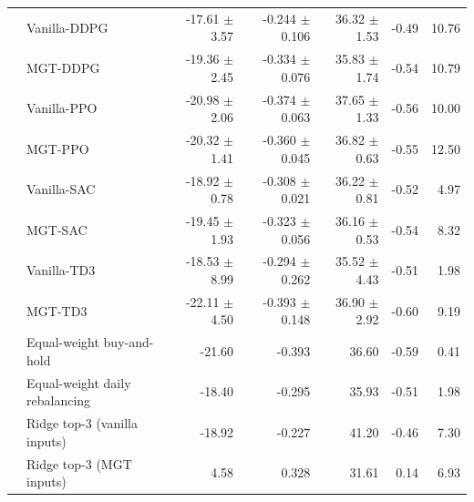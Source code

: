 \begin{table}[!t]
\begin{tabular}{llrrrrr}
 & Vanilla-DDPG & -17.61 $\pm$ 3.57 & -0.244 $\pm$ 0.106 & 36.32 $\pm$ 1.53 & -0.49 & 10.76 \\
 & MGT-DDPG & -19.36 $\pm$ 2.45 & -0.334 $\pm$ 0.076 & 35.83 $\pm$ 1.74 & -0.54 & 10.79 \\
 & Vanilla-PPO & -20.98 $\pm$ 2.06 & -0.374 $\pm$ 0.063 & 37.65 $\pm$ 1.33 & -0.56 & 10.00 \\
 & MGT-PPO & -20.32 $\pm$ 1.41 & -0.360 $\pm$ 0.045 & 36.82 $\pm$ 0.63 & -0.55 & 12.50 \\
 & Vanilla-SAC & -18.92 $\pm$ 0.78 & -0.308 $\pm$ 0.021 & 36.22 $\pm$ 0.81 & -0.52 & 4.97 \\
 & MGT-SAC & -19.45 $\pm$ 1.93 & -0.323 $\pm$ 0.056 & 36.16 $\pm$ 0.53 & -0.54 & 8.32 \\
 & Vanilla-TD3 & -18.53 $\pm$ 8.99 & -0.294 $\pm$ 0.262 & 35.52 $\pm$ 4.43 & -0.51 & 1.98 \\
 & MGT-TD3 & -22.11 $\pm$ 4.50 & -0.393 $\pm$ 0.148 & 36.90 $\pm$ 2.92 & -0.60 & 9.19 \\
 & Equal-weight buy-and-hold & -21.60 & -0.393 & 36.60 & -0.59 & 0.41 \\
 & Equal-weight daily rebalancing & -18.40 & -0.295 & 35.93 & -0.51 & 1.98 \\
 & Ridge top-3 (vanilla inputs) & -18.92 & -0.227 & 41.20 & -0.46 & 7.30 \\
 & Ridge top-3 (MGT inputs) & 4.58 & 0.328 & 31.61 & 0.14 & 6.93 \\
\bottomrule
\end{tabular}\end{table}